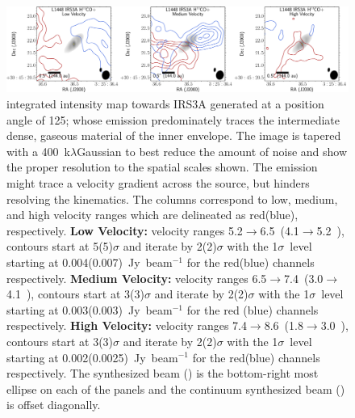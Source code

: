 \begin{figure}[H]
\begin{center}
   \includegraphics[width=1\textwidth]{img/L1448IRS3B_H13COp_image_taper400k__binned_panel.pdf} %
\end{center}
   \caption{\htcop\space integrated intensity map towards IRS3A generated at a position angle of 125\deg; whose emission predominately traces the intermediate dense, gaseous material of the inner envelope. The image is tapered with a 400~k$\lambda$\space Gaussian to best reduce the amount of noise and show the proper resolution to the spatial scales shown. The \htcop\space emission might trace a velocity gradient across the source, but  hinders resolving the kinematics. The columns correspond to low, medium, and high velocity ranges which are delineated as red(blue), respectively. \textbf{Low Velocity:} velocity ranges 5.2$\rightarrow$6.5~\kms (4.1$\rightarrow$5.2~\kms), contours start at 5(5)$\sigma$ and iterate by 2(2)$\sigma$ with the 1$\sigma$~level starting at 0.004(0.007)~Jy~beam$^{-1}$ for the red(blue) channels respectively. \textbf{Medium Velocity:}  velocity ranges 6.5$\rightarrow$7.4~\kms (3.0$\rightarrow$4.1~\kms), contours start at 3(3)$\sigma$ and iterate by 2(2)$\sigma$ with the 1$\sigma$~level starting at 0.003(0.003)~Jy~beam$^{-1}$ for the red (blue) channels respectively. \textbf{High Velocity:} velocity ranges 7.4$\rightarrow$8.6~\kms (1.8$\rightarrow$3.0~\kms), contours start at 3(3)$\sigma$ and iterate by 2(2)$\sigma$ with the 1$\sigma$~level starting at 0.002(0.0025)~Jy~beam$^{-1}$ for the red(blue) channels respectively. The \htcop\space synthesized beam (\htcopbeam) is the bottom-right most ellipse on each of the panels and the continuum synthesized beam (\contbeam) is offset diagonally.}\label{fig:irs3ah13copmoment}
\end{figure}


